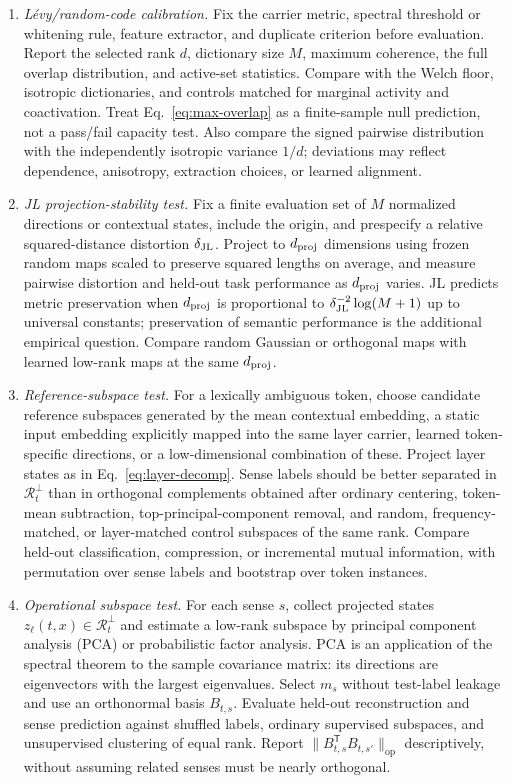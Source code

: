 \documentclass[
  aps,
  reprint,
  superscriptaddress,
  floatfix,
  nofootinbib,
  longbibliography
]{revtex4-2}
\newcommand{\Msem}{M}
\newcommand{\T}{^{\mathsf{T}}}
\newcommand{\opnorm}[1]{\lVert #1 \rVert_{\mathrm{op}}}
\begin{document}
\begin{enumerate}
\item \emph{L\'evy/random-code calibration.}
Fix the carrier metric, spectral threshold or whitening rule, feature extractor,
and duplicate criterion before evaluation.  Report the selected rank $d$,
dictionary size $\Msem$, maximum coherence, the full overlap distribution, and
active-set statistics.  Compare with the Welch floor, isotropic dictionaries,
and controls matched for marginal activity and coactivation.  Treat
Eq.~\eqref{eq:max-overlap} as a finite-sample null prediction, not a pass/fail
capacity test.  Also compare the signed pairwise distribution with the
independently isotropic variance $1/d$; deviations may reflect dependence,
anisotropy, extraction choices, or learned alignment.

\item \emph{JL projection-stability test.}
Fix a finite evaluation set of $\Msem$ normalized directions or contextual
states, include the origin, and prespecify a relative squared-distance
distortion $\delta_{\rm JL}$.  Project to $d_{\rm proj}$ dimensions using
frozen random maps scaled to preserve squared lengths on average, and measure
pairwise distortion and held-out task
performance as $d_{\rm proj}$ varies.  JL predicts metric preservation when
$d_{\rm proj}$ is proportional to
$\delta_{\rm JL}^{-2}\log(\Msem+1)$ up to universal constants; preservation of
semantic performance is the additional empirical question.  Compare random
Gaussian or orthogonal maps with learned low-rank maps at the same
$d_{\rm proj}$.

\item \emph{Reference-subspace test.}
For a lexically ambiguous token, choose candidate reference subspaces generated
by the mean contextual embedding, a static input embedding explicitly mapped
into the same layer carrier,
learned token-specific directions, or a low-dimensional combination of
these. Project layer states as in Eq.~\eqref{eq:layer-decomp}. Sense labels
should be better separated in $\mathcal R_t^\perp$ than in orthogonal
complements obtained after ordinary centering, token-mean subtraction,
top-principal-component removal, and random, frequency-matched, or
layer-matched control subspaces of the same rank.  Compare held-out
classification, compression, or incremental mutual information, with
permutation over sense labels and bootstrap over token instances.

\item \emph{Operational subspace test.}
For each sense $s$, collect projected states
$z_\ell(t,x)\in\mathcal R_t^\perp$ and estimate a low-rank subspace by
principal component analysis (PCA) or probabilistic factor analysis.  PCA is
an application of the spectral theorem to the sample covariance matrix: its
directions are eigenvectors with the largest eigenvalues.  Select $m_s$
without test-label leakage and use
an orthonormal basis $B_{t,s}$.  Evaluate held-out reconstruction and sense
prediction against shuffled labels, ordinary supervised subspaces, and
unsupervised clustering of equal rank.  Report
$\opnorm{B_{t,s}\T B_{t,s'}}$ descriptively, without assuming related senses
must be nearly orthogonal.


\end{enumerate}
\end{document}
